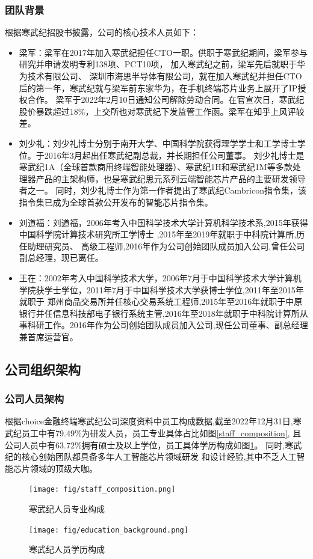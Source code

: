 \subsubsection{团队背景}
根据寒武纪招股书披露，公司的核心技术人员如下：
\begin{itemize}
    \item 梁军：梁军在2017年加入寒武纪担任CTO一职。供职于寒武纪期间，梁军参与研究并申请发明专利138项、PCT10项，
    加入寒武纪之前，梁军先后就职于华为技术有限公司、 深圳市海思半导体有限公司，就在加入寒武纪并担任CTO后的第一年，寒武纪就与梁军前东家华为，在手机终端芯片业务上展开了IP授权合作。
    梁军于2022年2月10日通知公司解除劳动合同。在官宣次日，寒武纪股价暴跌超过$18\%$，上交所也对寒武纪下发监管工作函。梁军在知乎上风评较差。
    \item 刘少礼：刘少礼博士分别于南开大学、中国科学院获得理学学士和工学博士学位。于2016年3月起出任寒武纪副总裁，并长期担任公司董事。
    刘少礼博士是寒武纪1A（全球首款商用终端智能处理器）、寒武纪1H和寒武纪1M等多款处理器产品的主架构师，也是寒武纪思元系列云端智能芯片产品的主要研发领导者之一。
    同时，刘少礼博士作为第一作者提出了寒武纪Cambricon指令集，该指令集已成为全球首款公开发布的智能芯片指令集。
    \item 刘道福：刘道福，2006年考入中国科学技术大学计算机科学技术系,2015年获得中国科学院计算技术研究所工学博士 ,2015年至2019年就职于中科院计算所,历任助理研究员、
    高级工程师,2016年作为公司创始团队成员加入公司,曾任公司副总经理，现已离任。 
    \item 王在：2002年考入中国科学技术大学，2006年7月于中国科学技术大学计算机学院获学士学位，2011年7月于中国科学技术大学获博士学位,2011年至2015年就职于
    郑州商品交易所并任核心交易系统工程师,2015年至2016年就职于中原银行并任信息科技部电子银行系统主管,2016年至2018年就职于中科院计算所从事科研工作。2016年作为公司创始团队成员加入公司,现任公司董事、副总经理兼首席运营官。 
\end{itemize}
\subsection{公司组织架构}
\subsubsection{公司人员架构}
根据choice金融终端寒武纪公司深度资料中员工构成数据,截至2022年12月31日,寒武纪员工中有$79.49\%$为研发人员，员工专业具体占比如图\ref{staff_composition},
且公司人员中有$63.72\%$拥有硕士及以上学位，员工具体学历构成如图\ref{education_background}。
同时,寒武纪的核心创始团队都具备多年人工智能芯片领域研发
和设计经验,其中不乏人工智能芯片领域的顶级大咖。
\begin{figure}[htb]
    \centering
  \begin{minipage}{0.49\linewidth}
    \centering
    \texttt{[image: fig/staff\_composition.png]}
    \caption{寒武纪人员专业构成}\label{staff_composition}
  \end{minipage}
  \begin{minipage}{0.49\linewidth}
    \centering
    \texttt{[image: fig/education\_background.png]}
    \caption{寒武纪人员学历构成}\label{education_background}
  \end{minipage}
\end{figure}
